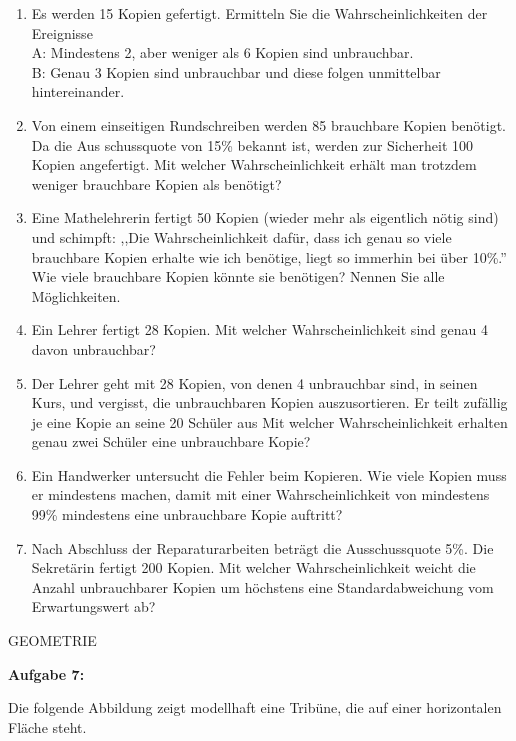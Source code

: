 \documentclass[a4paper,12pt]{article}
\newcommand{\Aufgabe}[1]{
  {
  \vspace*{0.5cm}
  \textsf{\textbf{Aufgabe #1}}
  \vspace*{0.2cm}
  
  }
}
\begin{document}
\begin{enumerate}[label={\alph*)}]
  \item Es werden 15 Kopien gefertigt. Ermitteln Sie die Wahrscheinlichkeiten der Ereignisse\\
    A: Mindestens 2, aber weniger als 6 Kopien sind unbrauchbar.\\
    B: Genau 3 Kopien sind unbrauchbar und diese folgen unmittelbar hintereinander.
  \item Von einem einseitigen Rundschreiben werden 85 brauchbare Kopien benötigt. Da die Aus schussquote von 15\% bekannt ist, werden zur Sicherheit 100 Kopien angefertigt. Mit welcher Wahrscheinlichkeit erhält man trotzdem weniger brauchbare Kopien als benötigt?
  \item Eine Mathelehrerin fertigt 50 Kopien (wieder mehr als eigentlich nötig sind) und schimpft: ,,Die Wahrscheinlichkeit dafür, dass ich genau so viele brauchbare Kopien erhalte wie ich benötige, liegt so immerhin bei über 10\%.'' Wie viele brauchbare Kopien könnte sie benötigen? Nennen Sie alle Möglichkeiten.
  \item Ein Lehrer fertigt 28 Kopien. Mit welcher Wahrscheinlichkeit sind genau 4 davon unbrauchbar?
  \item Der Lehrer geht mit 28 Kopien, von denen 4 unbrauchbar sind, in seinen Kurs, und vergisst, die unbrauchbaren Kopien auszusortieren. Er teilt zufällig je eine Kopie an seine 20 Schüler aus Mit welcher Wahrscheinlichkeit erhalten genau zwei Schüler eine unbrauchbare Kopie?
  \item Ein Handwerker untersucht die Fehler beim Kopieren. Wie viele Kopien muss er mindestens machen, damit mit einer Wahrscheinlichkeit von mindestens 99\% mindestens eine unbrauchbare Kopie auftritt? 
  \item Nach Abschluss der Reparaturarbeiten beträgt die Ausschussquote 5\%. Die Sekretärin fertigt 200 Kopien. Mit welcher Wahrscheinlichkeit weicht die Anzahl unbrauchbarer Kopien um höchstens eine Standardabweichung vom Erwartungswert ab?\\
\end{enumerate}

\newpage
\addtolength{\voffset}{-2cm}
GEOMETRIE

\Aufgabe{7:} 
Die folgende Abbildung zeigt modellhaft eine Tribüne, die auf einer horizontalen Fläche steht.
\end{document}
